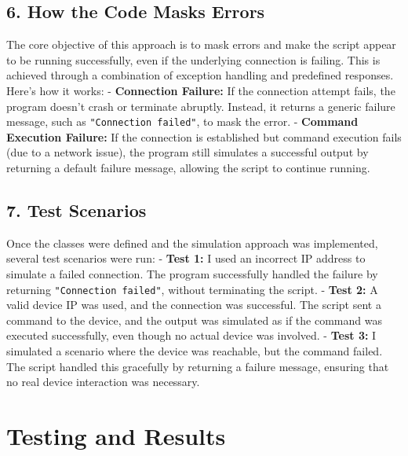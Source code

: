 \documentclass[11pt]{article}
\begin{document}
\hypertarget{how-the-code-masks-errors}{%
\subsection{6. How the Code Masks
Errors}\label{how-the-code-masks-errors}}

The core objective of this approach is to mask errors and make the
script appear to be running successfully, even if the underlying
connection is failing. This is achieved through a combination of
exception handling and predefined responses. Here's how it works: -
\textbf{Connection Failure:} If the connection attempt fails, the
program doesn't crash or terminate abruptly. Instead, it returns a
generic failure message, such as \texttt{"Connection\ failed"}, to mask
the error. - \textbf{Command Execution Failure:} If the connection is
established but command execution fails (due to a network issue), the
program still simulates a successful output by returning a default
failure message, allowing the script to continue running.

\hypertarget{test-scenarios}{%
\subsection{7. Test Scenarios}\label{test-scenarios}}

Once the classes were defined and the simulation approach was
implemented, several test scenarios were run: - \textbf{Test 1:} I used
an incorrect IP address to simulate a failed connection. The program
successfully handled the failure by returning
\texttt{"Connection\ failed"}, without terminating the script. -
\textbf{Test 2:} A valid device IP was used, and the connection was
successful. The script sent a command to the device, and the output was
simulated as if the command was executed successfully, even though no
actual device was involved. - \textbf{Test 3:} I simulated a scenario
where the device was reachable, but the command failed. The script
handled this gracefully by returning a failure message, ensuring that no
real device interaction was necessary.

    \hypertarget{testing-and-results}{%
\section{Testing and Results}\label{testing-and-results}}

    
\end{document}
